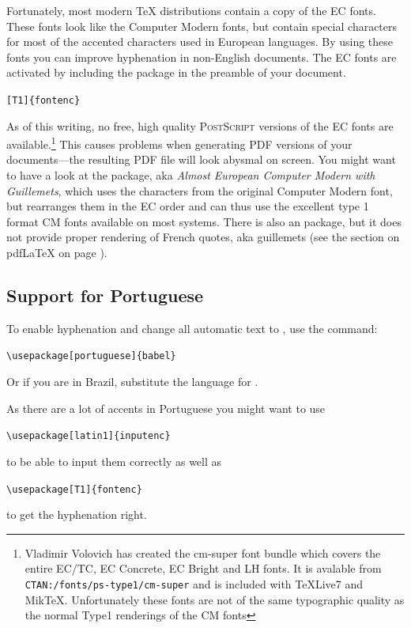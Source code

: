 Fortunately, most modern \TeX{} distributions contain a copy of the EC
fonts. These fonts look like the Computer Modern fonts, but contain
special characters for most of the accented characters used in
European languages. By using these fonts you can improve hyphenation
in non-English documents. The EC fonts are activated by including the
 package in the preamble of your document. \label{fontenc}

\begin{lscommand}
\verb|[T1]{fontenc}| 
\end{lscommand}

As of this writing, no free, high quality \textsc{PostScript} versions of the EC fonts are
available.\footnote{Vladimir Volovich has created the cm-super font bundle
which covers the entire EC/TC, EC Concrete, EC Bright and LH fonts. It is avalable from \texttt{CTAN:/fonts/ps-type1/cm-super} and is
included with \TeX{}Live7 and Mik\TeX. Unfortunately these fonts are not
of the same typographic quality as the normal Type1 renderings of the CM fonts} This causes problems when generating PDF versions of your
documents---the resulting PDF file will look abysmal on screen. You might
want to have a look at the  package, aka \emph{Almost European
Computer Modern with Guillemets}, which uses the characters from the original Computer
Modern font, but rearranges them in the EC order and can thus use the
excellent type 1 format CM fonts available on most systems. There is also an  package, but it
does not provide proper rendering of French quotes, aka guillemets (see the section
on pdf\LaTeX{} on page \pageref{sec:pdftex}).

\subsection{Support for Portuguese}

To enable hyphenation and change all automatic text to ,
 use the command:
\begin{lscommand}
\verb|\usepackage[portuguese]{babel}|
\end{lscommand}
Or if you are in Brazil, substitute the language for .

As there are a lot of accents in Portuguese you might want to use
\begin{lscommand}
\verb|\usepackage[latin1]{inputenc}|
\end{lscommand}
to be able to input them correctly as well as 
\begin{lscommand}
\verb|\usepackage[T1]{fontenc}|
\end{lscommand}
to get the hyphenation right.


